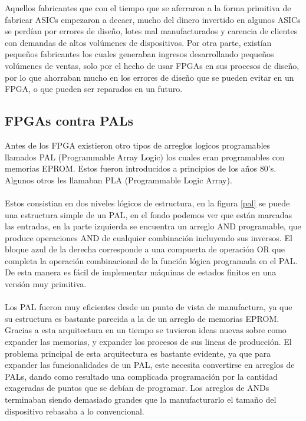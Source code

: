 \documentclass[twoside,spanish,ESP,MSc]{plantillaLabUPV}
\theoremstyle{definition}
\begin{document}
Aquellos fabricantes que con el tiempo que se aferraron a la forma primitiva de fabricar ASICs empezaron a decaer, mucho del dinero invertido en algunos ASICs se perdían por errores de diseño, lotes mal manufacturados y carencia de clientes con demandas de altos volúmenes de dispositivos. Por otra parte, existían pequeños fabricantes los cuales generaban ingresos desarrollando pequeños volúmenes de ventas, solo por el hecho de usar FPGAs en sus procesos de diseño, por lo que ahorraban mucho en los errores de diseño que se pueden evitar en un FPGA, o que pueden ser reparados en un futuro.

\subsection*{FPGAs contra PALs}%

Antes de los FPGA existieron otro tipos de arreglos logicos programables llamados PAL (Programmable Array Logic) los cuales eran programables con memorias EPROM. Estos fueron introducidos a principios de los años 80's. Algunos otros les llamaban PLA (Programmable Logic Array).\\\\
Estos consistian en dos niveles lógicos de estructura, en la figura \ref{pal} se puede una estructura simple de un PAL, en el fondo podemos ver que están marcadas las entradas, en la parte izquierda se encuentra un arreglo AND programable, que produce operaciones AND de cualquier combinación incluyendo sus inversos. El bloque azul de la derecha corresponde a una compuerta de operación OR que completa la operación combinacional de la función lógica programada en el PAL. De esta manera es fácil de implementar máquinas de estados finitos en una versión muy primitiva.\\\\

Los PAL fueron muy eficientes desde un punto de vista de manufactura, ya que su estructura es bastante parecida a la de un arreglo de memorias EPROM. Gracias a esta arquitectura en un tiempo se tuvieron ideas nuevas sobre como expander las memorias, y expander los procesos de sus lineas de producción. El problema principal de esta arquitectura es bastante evidente, ya que para expander las funcionalidades de un PAL, este necesita convertirse en arreglos de PALs, dando como resultado una complicada programación por la cantidad exageradas de puntos que se debían de programar. Los arreglos de ANDs terminaban siendo demasiado grandes que la manufacturarlo el tamaño del dispositivo rebasaba a lo convencional. 
\end{document}
